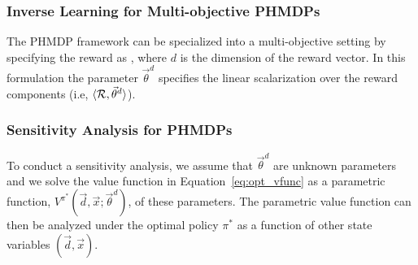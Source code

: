 

\subsubsection{Inverse Learning for Multi-objective PHMDPs}

The PHMDP framework can be specialized into a multi-objective setting by specifying the reward as {\footnotesize \MORewardFunc}, where {\footnotesize $ d $} is the dimension of the reward vector. In this formulation the parameter {\footnotesize $ \vec{\theta}^{d} $} specifies the linear scalarization over the reward components (i.e, {\footnotesize $\langle \mathcal{R}, \vec{\theta}^{d} \rangle$}).

\subsubsection{Sensitivity Analysis for PHMDPs}

To conduct a sensitivity analysis, we assume that {\footnotesize $\vec{\theta}^{d}$} are unknown parameters and we solve the value function in Equation~\eqref{eq:opt_vfunc} as a parametric function, {\footnotesize $V^{\pi^{*}}(\vec{d}, \vec{x}; \vec{\theta}^{d})$}, of these parameters. The parametric value function can then be analyzed under the optimal policy {\footnotesize $ \pi^{*} $} as a function of other state variables {\footnotesize $(\vec{d}, \vec{x})$}.

